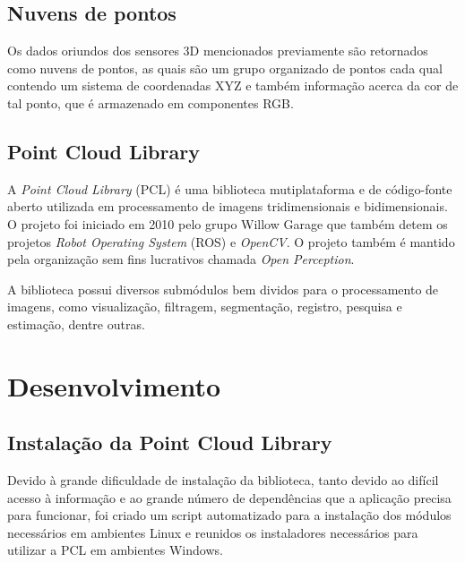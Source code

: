 \documentclass[12pt]{article}
\begin{document}
\subsection{Nuvens de pontos}

Os dados oriundos dos sensores 3D mencionados previamente são retornados como nuvens de pontos, as quais são um grupo organizado de pontos cada qual contendo um sistema de coordenadas XYZ e também informação acerca da cor de tal ponto, que é armazenado em componentes RGB.

\subsection{Point Cloud Library}

A \textit{Point Cloud Library} (PCL) é uma biblioteca mutiplataforma e de código-fonte aberto utilizada em processamento de imagens tridimensionais e bidimensionais. O projeto foi iniciado em 2010 pelo grupo Willow Garage que também detem os projetos \textit{Robot Operating System} (ROS) e \textit{OpenCV}. O projeto também é mantido pela organização sem fins lucrativos chamada \textit{Open Perception}.

A biblioteca possui diversos submódulos bem dividos para o processamento de imagens, como visualização, filtragem, segmentação, registro, pesquisa e estimação, dentre outras.

\section{Desenvolvimento} \label{sec:desenvolvimento}
\subsection{Instalação da Point Cloud Library}
Devido à grande dificuldade de instalação da biblioteca, tanto devido ao difícil acesso à informação e ao grande número de dependências que a aplicação precisa para funcionar, foi criado um script automatizado para a instalação dos módulos necessários em ambientes Linux e reunidos os instaladores necessários para utilizar a PCL em ambientes Windows. 
\end{document}

